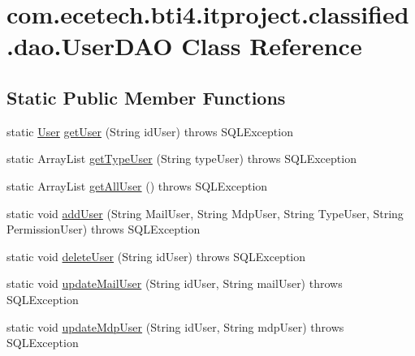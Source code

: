 \hypertarget{classcom_1_1ecetech_1_1bti4_1_1itproject_1_1classified_1_1dao_1_1_user_d_a_o}{}\section{com.\+ecetech.\+bti4.\+itproject.\+classified.\+dao.\+User\+D\+AO Class Reference}
\label{classcom_1_1ecetech_1_1bti4_1_1itproject_1_1classified_1_1dao_1_1_user_d_a_o}
\subsection*{Static Public Member Functions}
\begin{DoxyCompactItemize}
\item 
static \hyperlink{classcom_1_1ecetech_1_1bti4_1_1itproject_1_1classified_1_1beans_1_1_user}{User} \hyperlink{classcom_1_1ecetech_1_1bti4_1_1itproject_1_1classified_1_1dao_1_1_user_d_a_o_a8af4e016e646c4c5aeb19d1bc080a5d9}{get\+User} (String id\+User)  throws S\+Q\+L\+Exception 
\item 
static Array\+List \hyperlink{classcom_1_1ecetech_1_1bti4_1_1itproject_1_1classified_1_1dao_1_1_user_d_a_o_a394943d8e669666ccb92153d297195d2}{get\+Type\+User} (String type\+User)  throws S\+Q\+L\+Exception 
\item 
static Array\+List \hyperlink{classcom_1_1ecetech_1_1bti4_1_1itproject_1_1classified_1_1dao_1_1_user_d_a_o_a740fb334a19c3cbeede444bcda0bebd5}{get\+All\+User} ()  throws S\+Q\+L\+Exception 
\item 
static void \hyperlink{classcom_1_1ecetech_1_1bti4_1_1itproject_1_1classified_1_1dao_1_1_user_d_a_o_a297f979420b67bdb0d0f2a28390afbe5}{add\+User} (String Mail\+User, String Mdp\+User, String Type\+User, String Permission\+User)  throws S\+Q\+L\+Exception 
\item 
static void \hyperlink{classcom_1_1ecetech_1_1bti4_1_1itproject_1_1classified_1_1dao_1_1_user_d_a_o_a76d8afaa81750cbc918a1ba2c28bd6cc}{delete\+User} (String id\+User)  throws S\+Q\+L\+Exception 
\item 
static void \hyperlink{classcom_1_1ecetech_1_1bti4_1_1itproject_1_1classified_1_1dao_1_1_user_d_a_o_a41c75439f1d46cd0be06d07b0683c525}{update\+Mail\+User} (String id\+User, String mail\+User)  throws S\+Q\+L\+Exception 
\item 
static void \hyperlink{classcom_1_1ecetech_1_1bti4_1_1itproject_1_1classified_1_1dao_1_1_user_d_a_o_a9d7016c05055cc74bc36d5f86782a6ec}{update\+Mdp\+User} (String id\+User, String mdp\+User)  throws S\+Q\+L\+Exception 

\end{DoxyCompactItemize}
